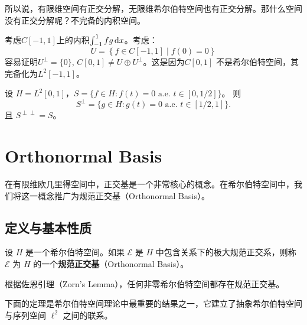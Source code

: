 所以说，有限维空间有正交分解，无限维希尔伯特空间也有正交分解。那什么空间没有正交分解呢？不完备的内积空间。
\begin{example}
    考虑\(C[-1,1]\)上的内积\(\int_{-1}^{1} fg \d{x}\)。考虑：\[
        U = \left\{ f\in  C[-1,1] \mid f(0)=0 \right\}
    \]
    容易证明\(U^{\perp } = \{0\} \), \(C[0,1] \neq U \oplus U^{\perp }
    \)。这是因为\(C[0,1]\) 不是希尔伯特空间，其完备化为\(L^2[-1,1]\)。
\end{example}

\begin{example}
    设 \(H = L^2[0, 1]\)，\(S = \{f \in H : f(t) = 0 \text{ a.e. } t
    \in [0, 1/2]\}\)。
    则
    \[
        S^\perp = \{g \in H : g(t) = 0 \text{ a.e. } t \in [1/2, 1]\}.
    \]
    且 \(S^{\perp\perp} = S\)。
\end{example}

\section{Orthonormal Basis}


在有限维欧几里得空间中，正交基是一个非常核心的概念。在希尔伯特空间中，我们将这一概念推广为规范正交基（Orthonormal Basis）。

\subsection{定义与基本性质}

\begin{definition}
    设 \(H\) 是一个希尔伯特空间。如果 \(\mathcal{E}\) 是 \(H\)
    中包含关系下的极大规范正交系，则称 \(\mathcal{E}\) 为 \(H\)
    的一个\textbf{规范正交基}（Orthonormal Basis）。
\end{definition}

根据佐恩引理（Zorn's Lemma），任何非零希尔伯特空间都存在规范正交基。

下面的定理是希尔伯特空间理论中最重要的结果之一，它建立了抽象希尔伯特空间与序列空间 \(\ell^2\) 之间的联系。

